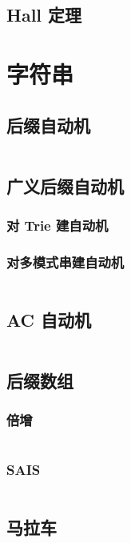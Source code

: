 \documentclass[a4paper, twoside]{article}
\begin{document}
\begin{multicols}{2}
			\subsection{Hall 定理}
				
			

		\newpage
		\section{字符串}

			\subsection{后缀自动机}
				\inputminted{cpp}{../src-midori/string/后缀自动机.cpp}
			
			\subsection{广义后缀自动机}
				\subsubsection{对 Trie 建自动机}
					
				\subsubsection{对多模式串建自动机}
					\inputminted{cpp}{../src-midori/string/广义后缀自动机-多模式串.cpp}
				
			\subsection{AC 自动机}
				\inputminted{cpp}{../src-midori/string/AC自动机.cpp}
			
			\subsection{后缀数组}
				\subsubsection{倍增}
					\inputminted{cpp}{../src-midori/string/SA.cpp}

				\subsubsection{SAIS}
					\inputminted{cpp}{../src-midori/string/SAIS.cpp}
			
			\subsection{马拉车}
				\inputminted{cpp}{../src-midori/string/manacher.cpp}
		

\end{multicols}
\end{document}

